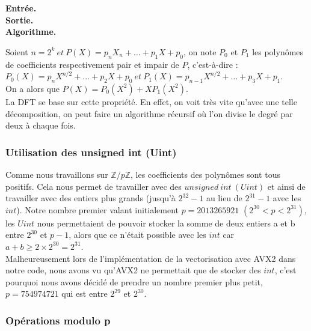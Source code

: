\documentclass[12pt, a4paper]{article}
\begin{document}
\begin{tcolorbox}[colback=cyan!5!white,
                  colframe=cyan!100!black,
                  title=\textbf{Algorithme DFT (METTRE SOURCES)}
                 ]
\textbf{Entrée.} \\
\textbf{Sortie.} \\
\textbf{Algorithme.}
\end{tcolorbox}

Soient $n = 2^k\ et\ P(X) = p_n X_n +\dots+p_1 X + p_0$, on note $P_0$ et $P_1$ les polynômes de coefficients respectivement pair et impair de $P$, c'est-à-dire : \\
$P_0(X) = p_{n} X^{n/2} +\dots+ p_2 X + p_0\ et\ P_1(X) = p_{n-1} X^{n/2} +\dots+ p_3 X + p_1$. \\
On a alors que $P(X) = P_0(X^2)+X P_1(X^2)$. \\
La DFT se base sur cette propriété. En effet, on voit très vite qu'avec une telle décomposition, on peut faire un algorithme récursif où l'on divise le degré par deux à chaque fois.

\subsubsection{Utilisation des unsigned int (Uint)}

Comme nous travaillons sur $\mathbb{Z}/p\mathbb{Z}$, les coefficients des polynômes sont tous positifs. Cela nous permet de travailler avec des $unsigned\ int\ (Uint)$ et ainsi de travailler avec des entiers plus grands (jusqu’à $2^{32}-1$ au lieu de $2^{31}-1$ avec les $int$). Notre nombre premier valant initialement $p=2013265921$ $(2^{30} < p < 2^{31})$, les $Uint$ nous permettaient de pouvoir stocker la somme de deux entiers a et b entre $2^{30}$ et $p-1$, alors que ce n'était possible avec les $int$ car $a+b\geq2\times2^{30}=2^{31}$. \\
Malheureusement lors de l'implémentation de la vectorisation avec AVX2 dans notre code, nous avons vu qu'AVX2 ne permettait que de stocker des $int$, c'est pourquoi nous avons décidé de prendre un nombre premier plus petit, $p=754974721$ qui est entre $2^{29}$ et  $2^{30}$.

\subsubsection{Opérations modulo p}
\end{document}
